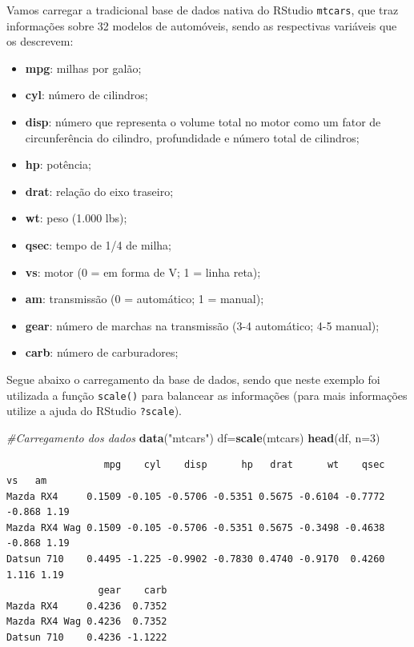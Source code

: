 \documentclass[12pt,brazil,oneside]{book}
\newenvironment{Shaded}{\begin{snugshade}}{\end{snugshade}}
\newcommand{\CommentTok}[1]{\textcolor[rgb]{0.56,0.35,0.01}{\textit{#1}}}
\newcommand{\DataTypeTok}[1]{\textcolor[rgb]{0.13,0.29,0.53}{#1}}
\newcommand{\DecValTok}[1]{\textcolor[rgb]{0.00,0.00,0.81}{#1}}
\newcommand{\KeywordTok}[1]{\textcolor[rgb]{0.13,0.29,0.53}{\textbf{#1}}}
\newcommand{\NormalTok}[1]{#1}
\newcommand{\StringTok}[1]{\textcolor[rgb]{0.31,0.60,0.02}{#1}}
\providecommand{\tightlist}{%
  \setlength{\itemsep}{0pt}\setlength{\parskip}{0pt}}
\begin{document}
Vamos carregar a tradicional base de dados nativa do RStudio \texttt{mtcars}, que traz informações sobre 32 modelos de automóveis, sendo as respectivas variáveis que os descrevem:

\begin{itemize}
\tightlist
\item
  \textbf{mpg}: milhas por galão;
\item
  \textbf{cyl}: número de cilindros;
\item
  \textbf{disp}: número que representa o volume total no motor como um fator de circunferência do cilindro, profundidade e número total de cilindros;
\item
  \textbf{hp}: potência;
\item
  \textbf{drat}: relação do eixo traseiro;
\item
  \textbf{wt}: peso (1.000 lbs);
\item
  \textbf{qsec}: tempo de 1/4 de milha;
\item
  \textbf{vs}: motor (0 = em forma de V; 1 = linha reta);
\item
  \textbf{am}: transmissão (0 = automático; 1 = manual);
\item
  \textbf{gear}: número de marchas na transmissão (3-4 automático; 4-5 manual);
\item
  \textbf{carb}: número de carburadores;
\end{itemize}

Segue abaixo o carregamento da base de dados, sendo que neste exemplo foi utilizada a função \texttt{scale()} para balancear as informações (para mais informações utilize a ajuda do RStudio \texttt{?scale}).

\begin{Shaded}
\begin{Highlighting}[]
\CommentTok{#Carregamento dos dados}
\KeywordTok{data}\NormalTok{(}\StringTok{"mtcars"}\NormalTok{)}
\NormalTok{df=}\KeywordTok{scale}\NormalTok{(mtcars)}
\KeywordTok{head}\NormalTok{(df, }\DataTypeTok{n=}\DecValTok{3}\NormalTok{)}
\end{Highlighting}
\end{Shaded}

\begin{verbatim}
                 mpg    cyl    disp      hp   drat      wt    qsec     vs   am
Mazda RX4     0.1509 -0.105 -0.5706 -0.5351 0.5675 -0.6104 -0.7772 -0.868 1.19
Mazda RX4 Wag 0.1509 -0.105 -0.5706 -0.5351 0.5675 -0.3498 -0.4638 -0.868 1.19
Datsun 710    0.4495 -1.225 -0.9902 -0.7830 0.4740 -0.9170  0.4260  1.116 1.19
                gear    carb
Mazda RX4     0.4236  0.7352
Mazda RX4 Wag 0.4236  0.7352
Datsun 710    0.4236 -1.1222
\end{verbatim}
\end{document}
